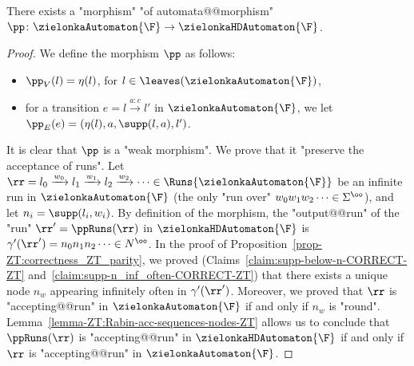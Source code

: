 \documentclass[10pt,a4paper]{amsart}
\renewcommand{\gg}{\gamma}
\renewcommand{\SS}{\Sigma}
\newcommand{\re}[1]{\xrightarrow{#1}}
\begin{document}
\begin{lemma}\label{lemma-ZT:morphism-parity-Rabin}
	There exists a "morphism" "of automata@@morphism" $\pp\colon \zielonkaAutomaton{\F} \to \zielonkaHDAutomaton{\F}$.
\end{lemma}
\begin{proof}
	We define the morphism $\pp$ as follows:
	\begin{itemize}
		\item $\pp_V(l) = \eta(l)$, for $l\in \leaves(\zielonkaAutomaton{\F})$,
		\item for a transition $e = l\re{a:c} l'$ in $\zielonkaAutomaton{\F}$, we let $\pp_E(e) = (\eta(l), a, \supp(l,a), l')$.
	\end{itemize}
	It is clear that $\pp$ is a "weak morphism". We prove that it "preserve the acceptance of runs". Let $\rr = l_0\re{w_0}l_1\re{w_1}l_2\re{w_2}\dots \in \Runs{\zielonkaAutomaton{\F}}$ be an infinite run in $\zielonkaAutomaton{\F}$ (the only "run over" $w_0w_1w_2\dots \in \SS^\oo$), and let $n_i = \supp(l_i,w_i)$. By definition of the morphism, the "output@@run" of the "run" $\rr' = \ppRuns(\rr)$ in $\zielonkaHDAutomaton{\F}$ is $\gg'(\rr') = n_0n_1n_2\dots \in N^\oo$. In the proof of Proposition~\ref{prop-ZT:correctness_ZT_parity}, we proved (Claims~\ref{claim:supp-below-n-CORRECT-ZT} and~\ref{claim:supp-n_inf_often-CORRECT-ZT}) that there exists a unique node $n_w$ appearing infinitely often in $\gg'(\rr')$. Moreover, we proved that $\rr$ is "accepting@@run" in $\zielonkaAutomaton{\F}$ if and only if $n_w$ is "round". Lemma~\ref{lemma-ZT:Rabin-acc-sequences-nodes-ZT} allows us to conclude that $\ppRuns(\rr)$ is "accepting@@run" in $\zielonkaHDAutomaton{\F}$ if and only if $\rr$ is "accepting@@run" in $\zielonkaAutomaton{\F}$.
\end{proof}
\end{document}
